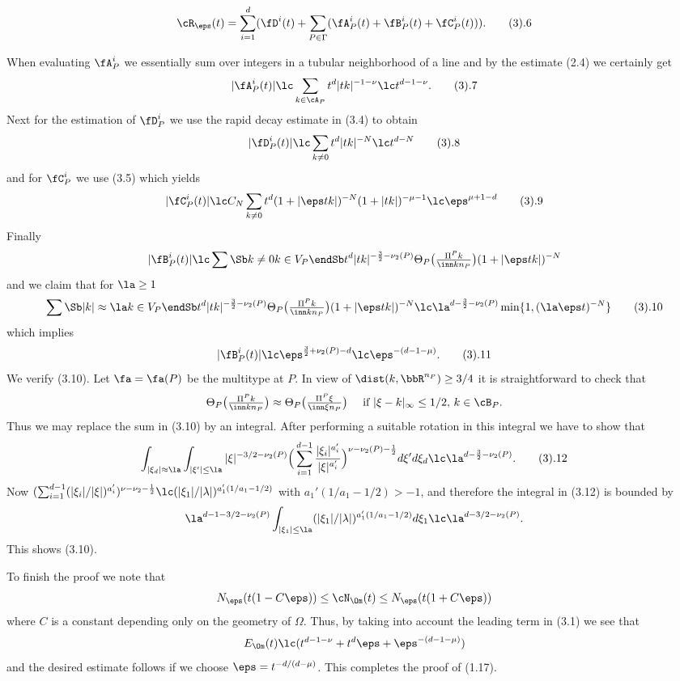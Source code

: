 $$
\cR_\eps(t)=\sum_{i=1}^d (\fD^i(t)+\sum_{P\in \Gamma}(\fA^i_P(t)+\fB^i_P(t) +\fC^i_P(t))).
\tag 3.6
$$



When evaluating $\fA^i_P$ we essentially sum over  integers in a tubular neighborhood of a line and by the estimate (2.4)  we certainly get
$$
|\fA^i_P(t)|\lc 
\sum_{k\in \cA_P}  t^d |tk|^{-1-\nu}\lc t^{d-1-\nu}.
\tag 3.7
$$
Next for the estimation of $\fD^i_P$ we use the rapid decay estimate in (3.4) to obtain
$$
|\fD^i_P(t)|\lc 
\sum_{k\neq 0}t^d   |tk|^{-N}\lc t^{d-N}
\tag 3.8
$$
and for  $\fC^i_P$ we use (3.5) which yields
$$
|\fC^i_P(t)|\lc C_N
 \sum_{k\neq 0}t^d (1+|\eps tk|)^{-N} (1+|tk|)^{-\mu-1}
\lc \eps^{\mu+1-d}
\tag 3.9
$$
Finally
$$
|\fB^i_P(t)|\lc 
 \sum\Sb k\neq 0\\ k\in V_P \endSb t^d |tk|^{-\frac 32-\nu_2(P)}\Theta_{P}
\big(\tfrac {\Pi^P k}{\inn k{n_P}}\big)
(1+|\eps tk|)^{-N}
$$ and we claim that
for $\la\ge 1$
$$
 \sum\Sb |k|\approx \la\\ k\in V_P\endSb t^d |tk|^{-\frac 32-\nu_2(P)}\Theta_{P}
\big(\tfrac {\Pi^P k}{\inn k{n_P}}\big)
(1+|\eps tk|)^{-N} \lc \la^{d-\frac 32 -\nu_2(P)}\min\{ 1, (\la\eps t)^{-N}\}
\tag 3.10
$$
which implies 
$$
|\fB^i_P(t)|\lc \eps^{\frac 32 +\nu_2(P)-d}\lc \eps^{-(d-1-\mu)}.
\tag 3.11
$$
We verify (3.10). Let $\fa=\fa(P)$ be the multitype at $P$.
In view of $\dist(k,\bbR^{n_P})\ge 3/4$ it is  straightforward to check that
$$
\Theta_{P}\big(\tfrac {\Pi^P k}{\inn k{n_P}}\big)\approx 
\Theta_{P}\big(\tfrac {\Pi^P \xi}{\inn \xi{n_P}}\big)\quad
\text{  if $|\xi-k|_\infty\le 1/2$, $k\in \cB_P$}.
$$
Thus we may replace the sum in (3.10) by an integral. 
After performing a suitable rotation in this integral  we have to show that
$$
\int_{|\xi_d|\approx \la}\int_{|\xi'|\le \la}|\xi|^{-3/2-\nu_2(P)}\Big(\sum_{i=1}^{d-1}
\frac{|\xi_i|^{a_i'}}{|\xi|^{a_i'}}\Big)^{\nu-\nu_2(P)-\frac 12}
d\xi' d\xi_d\lc \la^{d-\frac 32-\nu_2(P)}.
\tag 3.12
$$
Now 
$(\sum_{i=1}^{d-1}
(|\xi_i|/|\xi|)^{a_i'})^{\nu-\nu_2-\frac 12}\lc 
(|\xi_1|/|\lambda|)^{a_1'(1/a_1-1/2)}
$ with $a_1'(1/a_1-1/2)>-1$,
 and therefore the integral in (3.12) is bounded by
$$
\la^{d-1-3/2-\nu_2(P)} \int_{|\xi_1|\le \la}
(|\xi_1|/|\lambda|)^{a_1'(1/a_1-1/2)} d\xi_1\lc 
\la^{d-3/2-\nu_2(P)}.
$$
This shows (3.10).

To finish the proof we note that 
$$N_\eps(t(1-C\eps))\le \cN_\Om(t)\le 
N_\eps(t(1+C\eps))
$$
where $C$ is a constant depending only on the geometry of $\Omega$.
Thus, by taking into account the leading term  in (3.1) we see that
$$
E_\Om(t)\lc (t^{d-1-\nu}+t^d\eps +\eps^{-(d-1-\mu)})
$$
and the desired estimate follows if we choose 
$\eps= t^{-d/(d-\mu)}$.
This completes the proof of (1.17).

